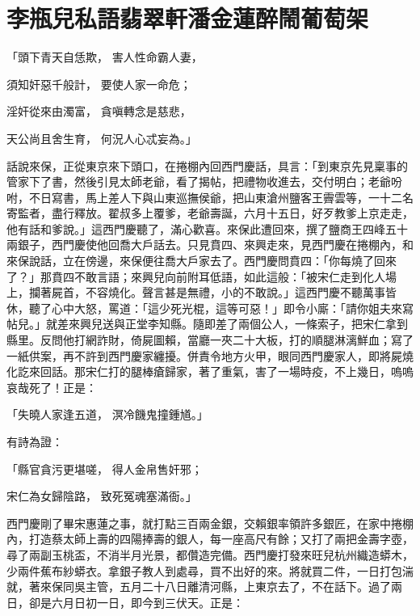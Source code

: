 %

\chapter{李瓶兒私語翡翠軒\KG 潘金蓮醉鬧葡萄架}


\begin{showcontents}{}




「頭下青天自恁欺，  害人性命霸人妻，

須知奸惡千般計，  要使人家一命危；

淫奸從來由濁富，  貪嗔轉念是慈悲，

天公尚且舍生育，  何況人心忒妄為。」

話說來保，正從東京來下頭口，在捲棚內回西門慶話，具言：「到東京先見稟事的管家下了書，然後引見太師老爺，看了揭帖，把禮物收進去，交付明白；老爺吩咐，不日寫書，馬上差人下與山東巡撫侯爺，把山東滄州鹽客王霽雲等，一十二名寄監者，盡行釋放。翟叔多上覆爹，老爺壽誕，六月十五日，好歹教爹上京走走，他有話和爹說。」這西門慶聽了，滿心歡喜。來保此遭回來，撰了鹽商王四峰五十兩銀子，西門慶使他回喬大戶話去。只見賁四、來興走來，見西門慶在捲棚內，和來保說話，立在傍邊，來保便往喬大戶家去了。西門慶問賁四：「你每燒了回來了？」那賁四不敢言語；來興兒向前附耳低語，如此這般：「被宋仁走到化人場上，攔著屍首，不容燒化。聲言甚是無禮，小的不敢說。」這西門慶不聽萬事皆休，聽了心中大怒，罵道：「這少死光棍，這等可惡！」即令小廝：「請你姐夫來寫帖兒。」就差來興兒送與正堂李知縣。隨即差了兩個公人，一條索子，把宋仁拿到縣里。反問他打網詐財，倚屍圖賴，當廳一夾二十大板，打的順腿淋漓鮮血；寫了一紙供案，再不許到西門慶家纏擾。併責令地方火甲，眼同西門慶家人，即將屍燒化訖來回話。那宋仁打的腿棒瘡歸家，著了重氣，害了一場時疫，不上幾日，嗚嗚哀哉死了！正是：

「失曉人家逢五道，  溟冷饑鬼撞鍾馗。」

有詩為證：

「縣官貪污更堪嗟，  得人金帛售奸邪；

宋仁為女歸陰路，  致死冤魂塞滿衙。」

西門慶剛了畢宋惠蓮之事，就打點三百兩金銀，交賴銀率領許多銀匠，在家中捲棚內，打造蔡太師上壽的四陽捧壽的銀人，每一座高尺有餘；又打了兩把金壽字壺，尋了兩副玉桃盃，不消半月光景，都儹造完備。西門慶打發來旺兒杭州織造蟒木，少兩件蕉布紗蟒衣。拿銀子教人到處尋，買不出好的來。將就買二件，一日打包湍就，著來保同吳主管，五月二十八日離清河縣，上東京去了，不在話下。過了兩日，卻是六月日初一日，即今到三伏天。正是：


\end{showcontents}
